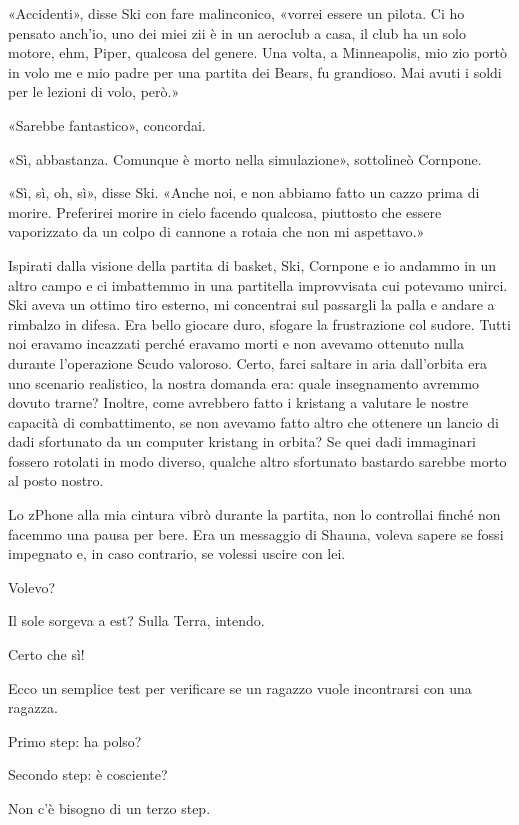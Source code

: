 «Accidenti», disse Ski con fare malinconico, «vorrei essere un pilota.
Ci ho pensato anch'io, uno dei miei zii è in un aeroclub a casa, il club
ha un solo motore, ehm, Piper, qualcosa del genere. Una volta, a
Minneapolis, mio zio portò in volo me e mio padre per una partita dei
Bears, fu grandioso. Mai avuti i soldi per le lezioni di volo, però.»

«Sarebbe fantastico», concordai.

«Sì, abbastanza. Comunque è morto nella simulazione», sottolineò
Cornpone.

«Sì, sì, oh, sì», disse Ski. «Anche noi, e non abbiamo fatto un cazzo
prima di morire. Preferirei morire in cielo facendo qualcosa, piuttosto
che essere vaporizzato da un colpo di cannone a rotaia che non mi
aspettavo.»

\hfill\break

Ispirati dalla visione della partita di basket, Ski, Cornpone e io
andammo in un altro campo e ci imbattemmo in una partitella improvvisata
cui potevamo unirci. Ski aveva un ottimo tiro esterno, mi concentrai sul
passargli la palla e andare a rimbalzo in difesa. Era bello giocare
duro, sfogare la frustrazione col sudore. Tutti noi eravamo incazzati
perché eravamo morti e non avevamo ottenuto nulla durante l'operazione
Scudo valoroso. Certo, farci saltare in aria dall'orbita era uno
scenario realistico, la nostra domanda era: quale insegnamento avremmo
dovuto trarne? Inoltre, come avrebbero fatto i kristang a valutare le
nostre capacità di combattimento, se non avevamo fatto altro che
ottenere un lancio di dadi sfortunato da un computer kristang in orbita?
Se quei dadi immaginari fossero rotolati in modo diverso, qualche altro
sfortunato bastardo sarebbe morto al posto nostro.

Lo zPhone alla mia cintura vibrò durante la partita, non lo controllai
finché non facemmo una pausa per bere. Era un messaggio di Shauna,
voleva sapere se fossi impegnato e, in caso contrario, se volessi uscire
con lei.

Volevo?

Il sole sorgeva a est? Sulla Terra, intendo.

Certo che sì!

Ecco un semplice test per verificare se un ragazzo vuole incontrarsi con
una ragazza.

Primo step: ha polso?

Secondo step: è cosciente?

Non c'è bisogno di un terzo step.

